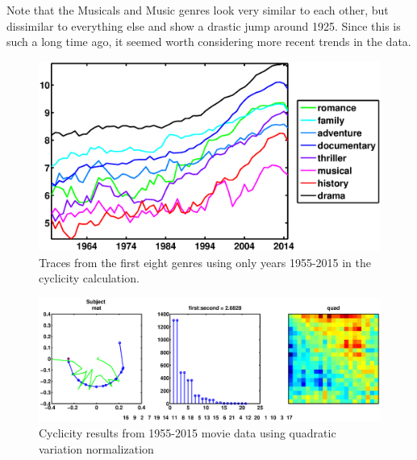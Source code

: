 \documentclass[11pt]{article}
\begin{document}
Note that the Musicals and Music genres look very similar to each other, but dissimilar to everything else and show a drastic jump around 1925. Since this is such a long time ago, it seemed worth considering more recent trends in the data.
\begin{figure}[H]
\begin{minipage}{.3\textwidth}
\end{minipage}
\hfill
\begin{minipage}{.6\textwidth}
\includegraphics[width=\textwidth]{pictures/movie_data_1955-2015.eps}
\caption{Traces from the first eight genres using only years 1955-2015 in the cyclicity calculation.}
\end{minipage}
\end{figure}
\begin{figure}[H]
\centering
\includegraphics[trim= 130 0 130 0, clip, width=\textwidth]{pictures/movie_data_1955-2015_QC.eps}
\caption{Cyclicity results from 1955-2015 movie data using quadratic variation normalization}
\end{figure}
\end{document}
